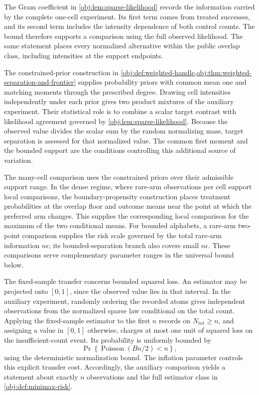 The Gram coefficient  in \cref{obj:lem:sparse-likelihood} records the information carried by the complete one-cell experiment. Its first term comes from treated successes, and its second term includes the intensity dependence of both control counts. The bound therefore supports a comparison using the full observed likelihood. The same statement places every normalized alternative within the public overlap class, including intensities at the support endpoints.

The constrained-prior construction in \cref{obj:def:weighted-handle,obj:thm:weighted-separation-and-frontier} supplies probability priors with common mean one and matching moments through the prescribed degree. Drawing cell intensities independently under each prior gives two product mixtures of the auxiliary experiment. Their statistical role is to combine a scalar target contrast with likelihood agreement governed by \cref{obj:lem:sparse-likelihood}. Because the observed value divides the scalar sum by the random normalizing mass, target separation is assessed for that normalized value. The common first moment and the bounded support are the conditions controlling this additional source of variation.

The many-cell comparison uses the constrained priors over their admissible support range. In the dense regime, where rare-arm observations per cell support local comparisons, the boundary-propensity construction places treatment probabilities at the overlap floor and outcome means near the point at which the preferred arm changes. This supplies the corresponding local comparison for the maximum of the two conditional means. For bounded alphabets, a rare-arm two-point comparison supplies the risk scale governed by the total rare-arm information \(n\epsilon\); its bounded-separation branch also covers small \(n\epsilon\). These comparisons serve complementary parameter ranges in the universal bound below.

The fixed-sample transfer concerns bounded squared loss. An estimator may be projected onto \([0,1]\), since the observed value lies in that interval. In the auxiliary experiment, randomly ordering the recorded atoms gives independent observations from the normalized sparse law conditional on the total count. Applying the fixed-sample estimator to the first \(n\) records on \(N_{\mathrm{tot}}\ge n\), and assigning a value in \([0,1]\) otherwise, charges at most one unit of squared loss on the insufficient-count event. Its probability is uniformly bounded by
\[
\Pr\!\left\{\operatorname{Poisson}(Bn/2)<n\right\},
\]
using the deterministic normalization bound. The inflation parameter controls this explicit transfer cost. Accordingly, the auxiliary comparison yields a statement about exactly \(n\) observations and the full estimator class in \cref{obj:def:minimax-risk}.

